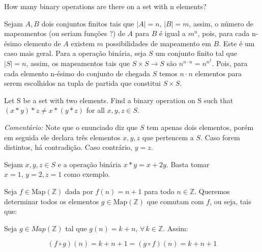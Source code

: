 \begin{exercicio}{1.22}
	How many binary operations are there on a set with n elements?
\end{exercicio}

\begin{solucao}
	Sejam \(A, B\) dois conjuntos finitos tais que \(|A| = n, \, |B| = m\), assim, o número de mapeamentos (ou seriam funções ?) de \(A\) para \(B\) é igual a \(m^n\), pois, para cada n-ésimo elemento de $A$ existem $m$ possibilidades de mapeamento em $B$. Este é um caso mais geral. Para a operação binária, seja $S$ um conjunto finito tal que \(|S| = n\), assim, os mapeamentos tais que \(S \times S \longrightarrow S\) são \(n^{n \cdot n} = n^{n^2}\). Pois, para cada elemento n-ésimo do conjunto de chegada $S$ temos $n \cdot n$ elementos para serem escolhidos na tupla de partida que constitui $S \times S$.
\end{solucao}

\begin{exercicio}{1.23}
	Let S be a set with two elements. Find a binary operation  on S such that \((x * y) * z \neq x * (y * z)\) for all \(x, y,z \in S\).
\end{exercicio}

\begin{solucao}
	\textit{Comentário: } Note que o enunciado diz que \(S\) tem apenas dois elementos, porém em seguida ele declara três elementos $x,y,z$ que pertencem a $S$. Caso forem distintos, há contradição. Caso contrário, $y = z$.

	Sejam $x, y, z \in S$ e a operação binária $x * y = x + 2y$. Basta tomar \(x = 1, \, y = 2, z = 1\) como exemplo.
\end{solucao}

\begin{exercicio}{1.24}
	Seja \( f \in \text{Map}(\mathbb{Z}) \) dada por \( f(n) = n + 1 \) para todo \( n \in \mathbb{Z} \). Queremos determinar todos os elementos \( g \in \text{Map}(\mathbb{Z}) \) que comutam com \( f \), ou seja, tais que:
\end{exercicio}

\begin{solucao}
	Seja \(g \in Map(\mathbb{Z})\) tal que \(g(n) = k + n, \, \forall \, k \in \mathbb{Z}\). Assim:

	\[
		(f \circ g)(n) = k + n + 1 = (g \circ f)(n) = k + n + 1
	\]
\end{solucao}

